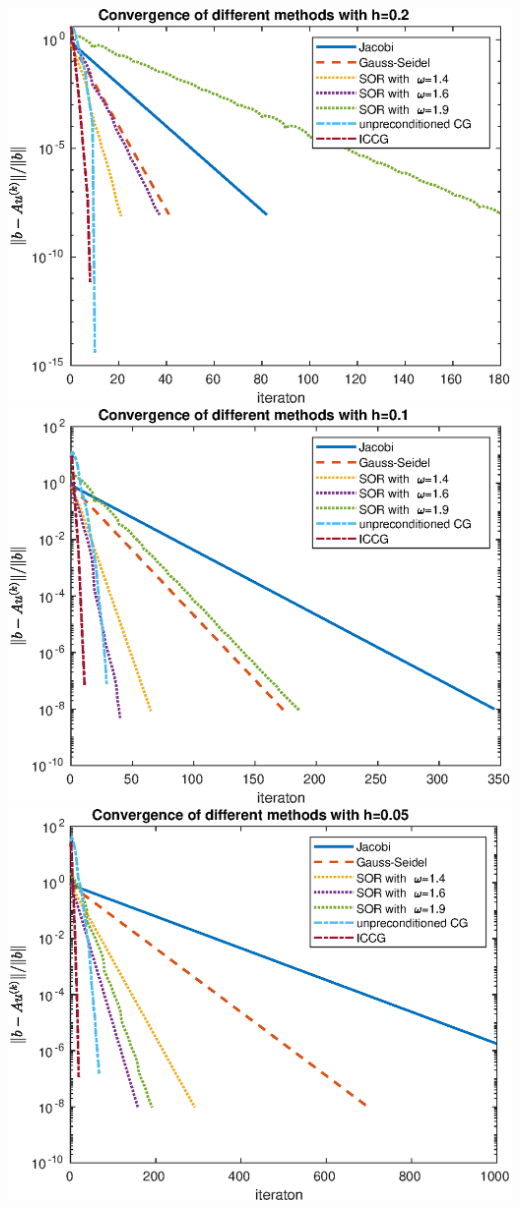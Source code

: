 \documentclass{article}
\begin{document}
\begin{centering}
\includegraphics[scale=0.7]{h=0.2.eps}\\
\includegraphics[scale=0.7]{h=0.1.eps}\\
\includegraphics[scale=0.7]{h=0.05.eps}\\

\end{centering}
\end{document}
